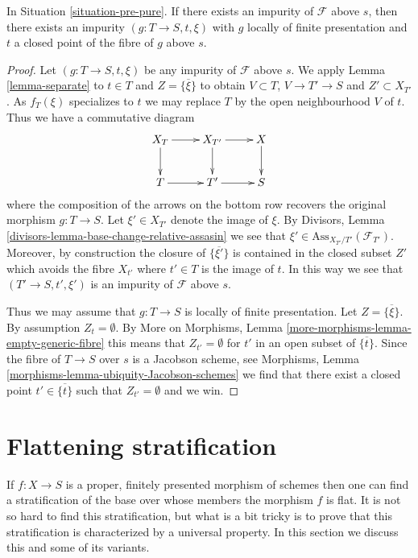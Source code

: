 \begin{lemma}
\label{lemma-impure-finite-presentation}
In Situation \ref{situation-pre-pure}.
If there exists an impurity of $\mathcal{F}$ above $s$, then
there exists an impurity $(g : T \to S, t, \xi)$ with
$g$ locally of finite presentation and $t$ a closed point of
the fibre of $g$ above $s$.
\end{lemma}

\begin{proof}
Let $(g : T \to S, t, \xi)$ be any impurity of $\mathcal{F}$ above $s$.
We apply
Lemma \ref{lemma-separate}
to $t \in T$ and $Z = \overline{\{\xi\}}$ to obtain
$V \subset T$, $V \to T' \to S$ and $Z' \subset X_{T'}$.
As $f_T(\xi)$ specializes to $t$
we may replace $T$ by the open neighbourhood $V$ of $t$. Thus
we have a commutative diagram
$$
\xymatrix{
X_T \ar[d] \ar[r] &
X_{T'} \ar[d] \ar[r] &
X \ar[d] \\
T \ar[r] & T' \ar[r] & S
}
$$
where the composition of the arrows on the bottom row recovers the
original morphism $g : T \to S$. Let $\xi' \in X_{T'}$ denote the
image of $\xi$. By
Divisors, Lemma \ref{divisors-lemma-base-change-relative-assasin}
we see that $\xi' \in \text{Ass}_{X_{T'}/T'}(\mathcal{F}_{T'})$.
Moreover, by construction the closure of $\overline{\{\xi'\}}$
is contained in the closed subset $Z'$ which avoids the fibre
$X_{t'}$ where $t' \in T$ is the image of $t$. In this way we see
that $(T' \to S, t', \xi')$ is an impurity of $\mathcal{F}$ above $s$.

\medskip\noindent
Thus we may assume that $g : T \to S$ is locally of finite presentation.
Let $Z = \overline{\{\xi\}}$. By assumption $Z_t = \emptyset$. By
More on Morphisms, Lemma \ref{more-morphisms-lemma-empty-generic-fibre}
this means that $Z_{t'} = \emptyset$ for $t'$ in an open subset
of $\overline{\{t\}}$. Since the fibre of
$T \to S$ over $s$ is a Jacobson scheme, see
Morphisms, Lemma \ref{morphisms-lemma-ubiquity-Jacobson-schemes}
we find that there exist a closed point $t' \in \overline{\{t\}}$ such that
$Z_{t'} = \emptyset$ and we win.
\end{proof}







\section{Flattening stratification}
\label{section-flattening}

\noindent
If $f : X \to S$ is a proper, finitely presented morphism
of schemes then one can find a stratification of the base
over whose members the morphism $f$ is flat. It is not so hard
to find this stratification, but what is a bit tricky is to prove
that this stratification is characterized by a universal property.
In this section we discuss this and some of its variants.


